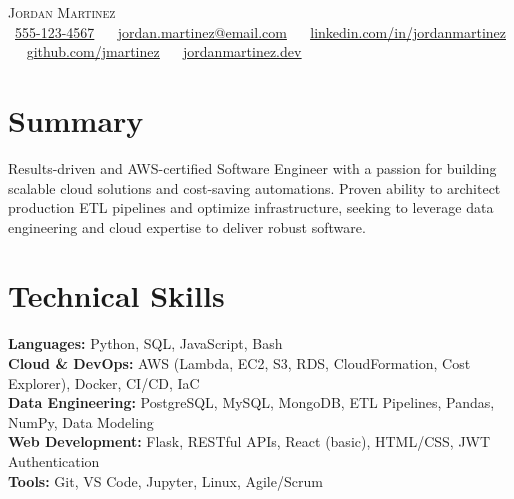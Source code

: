 \documentclass[letterpaper,10pt]{article}
\begin{document}
\begin{center}
    {\Large \scshape Jordan Martinez} \\[2mm]
    \footnotesize \raisebox{-0.1\height}
    \faPhone\ \underline{555-123-4567} ~ 
    {\faEnvelope\ \underline{jordan.martinez@email.com}} ~ 
    {\faLinkedin\ \underline{\href{https://www.linkedin.com/in/jordanmartinez}{linkedin.com/in/jordanmartinez}}} ~
    {\faGithub\ \underline{\href{https://github.com/jmartinez}{github.com/jmartinez}}} ~
    {\faGlobe\ \underline{\href{https://jordanmartinez.dev}{jordanmartinez.dev}}}
    \vspace{-8pt}
\end{center}

\section{Summary}
    \begin{itemize}[leftmargin=0.15in, label={}]
        \small{\item{
            Results-driven and AWS-certified Software Engineer with a passion for building scalable cloud solutions and cost-saving automations. Proven ability to architect production ETL pipelines and optimize infrastructure, seeking to leverage data engineering and cloud expertise to deliver robust software.
        }}
    \end{itemize}
\vspace{-16pt}

\section{Technical Skills}
    \begin{itemize}[leftmargin=0.15in, label={}]
        \small{\item{
            \textbf{Languages:} Python, SQL, JavaScript, Bash \\
            \textbf{Cloud \& DevOps:} AWS (Lambda, EC2, S3, RDS, CloudFormation, Cost Explorer), Docker, CI/CD, IaC \\
            \textbf{Data Engineering:} PostgreSQL, MySQL, MongoDB, ETL Pipelines, Pandas, NumPy, Data Modeling \\
            \textbf{Web Development:} Flask, RESTful APIs, React (basic), HTML/CSS, JWT Authentication \\
            \textbf{Tools:} Git, VS Code, Jupyter, Linux, Agile/Scrum
        }}
    \end{itemize}
\vspace{-16pt}
\end{document}
